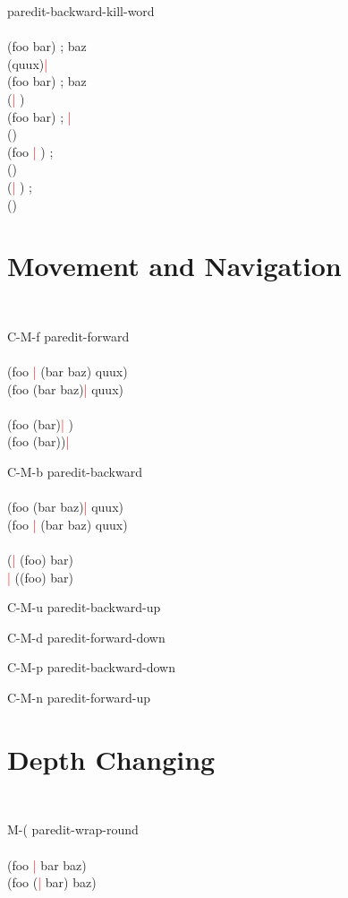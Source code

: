 \documentclass[8pt,a4paper,landscape]{extarticle}
\newcommand{\csr}{\textcolor{red}{| }}
\begin{document}
\begin{multicols}{4}
\begin{eqlist}
\longitem[M-DEL] paredit-backward-kill-word\\
  \\
  (foo bar)    ; baz\\
  (quux)\csr \\
  (foo bar)    ; baz\\
  (\csr )\\
  (foo bar)    ; \csr \\
  ()\\
  (foo \csr )    ; \\
  ()\\
  (\csr )    ; \\
  ()\\
\end{eqlist}

\section{Movement and Navigation}
\begin{eqlist}
  \tt
\item[C-M-f] paredit-forward\\
  \\
  (foo \csr (bar baz) quux)\\
  (foo (bar baz)\csr  quux)\\
  \\
  (foo (bar)\csr )\\
  (foo (bar))\csr \\


\item[C-M-b] paredit-backward\\
  \\
  (foo (bar baz)\csr  quux)\\
  (foo \csr (bar baz) quux)\\
  \\
  (\csr (foo) bar)\\
  \csr ((foo) bar)\\

\item[C-M-u] paredit-backward-up
\item[C-M-d] paredit-forward-down
\item[C-M-p] paredit-backward-down
\item[C-M-n] paredit-forward-up

\end{eqlist}

\section{Depth Changing}
\begin{eqlist}
  \tt
\item[M-(] paredit-wrap-round\\
  \\
  (foo \csr bar baz)\\
  (foo (\csr bar) baz)\\



\end{eqlist}
\end{multicols}
\end{document}
